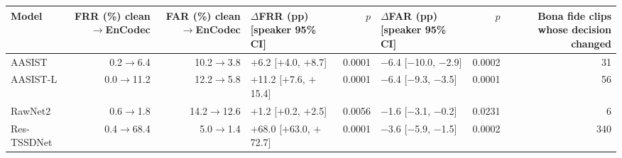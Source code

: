 \begin{tabular}{@{}lrrlrlrr@{}}
\toprule
Model & FRR (\%) clean$\to$EnCodec & FAR (\%) clean$\to$EnCodec & $\Delta$FRR (pp) [speaker 95\% CI] & $p$ & $\Delta$FAR (pp) [speaker 95\% CI] & $p$ & Bona fide clips whose decision changed \\
\midrule
AASIST & 0.2$\to$6.4 & 10.2$\to$3.8 & $+$6.2 [$+$4.0, $+$8.7] & 0.0001 & $-$6.4 [$-$10.0, $-$2.9] & 0.0002 & 31 \\
AASIST-L & 0.0$\to$11.2 & 12.2$\to$5.8 & $+$11.2 [$+$7.6, $+$15.4] & 0.0001 & $-$6.4 [$-$9.3, $-$3.5] & 0.0001 & 56 \\
RawNet2 & 0.6$\to$1.8 & 14.2$\to$12.6 & $+$1.2 [$+$0.2, $+$2.5] & 0.0056 & $-$1.6 [$-$3.1, $-$0.2] & 0.0231 & 6 \\
Res-TSSDNet & 0.4$\to$68.4 & 5.0$\to$1.4 & $+$68.0 [$+$63.0, $+$72.7] & 0.0001 & $-$3.6 [$-$5.9, $-$1.5] & 0.0002 & 340 \\
\bottomrule
\end{tabular}
